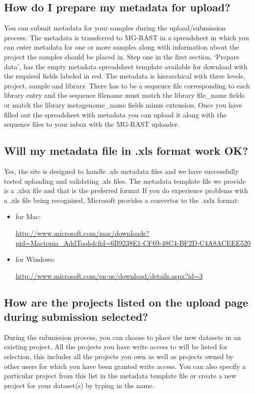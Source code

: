\documentclass[12pt,fullpage]{report}
\begin{document}
\subsection{How do I prepare my metadata for upload?}
You can submit metadata for your samples during the upload/submission process. The metadata is transferred to MG-RAST in a spreadsheet in which you can enter metadata for one or more samples along with information about the project the samples should be placed in. Step one in the first section, `Prepare data', has the empty metadata spreadsheet template available for download with the required fields labeled in red. The metadata is hierarchical with three levels, project, sample and library. There has to be a sequence file corresponding to each library entry and the sequence filename must match the library file\_name fields or match the library metagenome\_name fields minus extension. Once you have filled out the spreadsheet with metadata you can upload it along with the sequence files to your inbox with the MG-RAST uploader.
\subsection{Will my metadata file in .xls format work OK?}
Yes, the site is designed to handle .xls metadata files and we have successfully tested uploading and validating .xls files. The metadata template file we provide is a .xlsx file and that is the preferred format
If you do experience problems with a .xls file being recognized, Microsoft provides a convertor to the .xslx format:
\begin{itemize}
\item  for Mac: \begin{small}\url{http://www.microsoft.com/mac/downloads?pid=Mactopia\_AddTools\&fid=6B9238E1-CF69-48C4-BF2D-C4A8ACEEE520}\end{small}
\item  for Windows: \begin{small}\url{http://www.microsoft.com/en-us/download/details.aspx?id=3}\end{small}
\end{itemize}
\subsection{How are the projects listed on the upload page during submission selected?}
During the submission process, you can choose to place the new datasets in an existing project. All the projects you have write access to will be listed for selection, this includes all the projects you own as well as projects owned by other users for which you have been granted write access.
You can also specify a particular project from this list in the metadata template file or create a new project for your dataset(s) by typing in the name.
\end{document}
